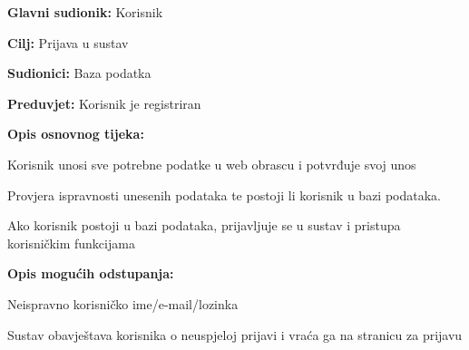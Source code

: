 				\noindent {}
				\begin{packed_item}
					
					\item \textbf{Glavni sudionik: }Korisnik
					\item  \textbf{Cilj:} Prijava u sustav
					\item  \textbf{Sudionici:} Baza podatka
					\item  \textbf{Preduvjet:} Korisnik je registriran
					\item  \textbf{Opis osnovnog tijeka:}
					
					\item[] \begin{packed_enum}
						
						\item Korisnik unosi sve potrebne podatke u web obrascu i potvrđuje svoj unos
						\item Provjera  ispravnosti unesenih podataka te postoji li korisnik u bazi podataka.
						\item Ako korisnik postoji u bazi podataka, prijavljuje se u sustav i pristupa korisničkim funkcijama
						
					\end{packed_enum}
					
					\item  \textbf{Opis mogućih odstupanja:}
					
					\item[] \begin{packed_item}
						
						\item[2.a] Neispravno korisničko ime/e-mail/lozinka
						\item[] \begin{packed_enum}
							
							\item Sustav obavještava korisnika o neuspjeloj prijavi i vraća ga na stranicu za prijavu
							
						\end{packed_enum}
						
					\end{packed_item}
				\end{packed_item}
				
